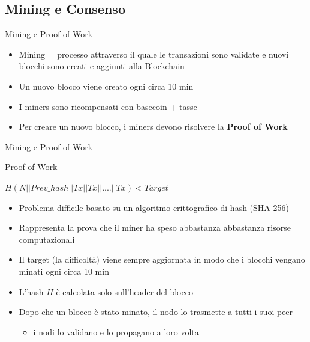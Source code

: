 \documentclass{beamer}
\begin{document}
  
  \subsection{Mining e Consenso}
  \begin{frame}{Mining e Proof of Work}
      \begin{itemize}
          \item Mining = processo attraverso il quale le transazioni sono validate e nuovi blocchi sono creati e aggiunti alla Blockchain
          \item Un nuovo blocco viene creato ogni circa 10 min 
          \item I miners sono ricompensati con basecoin + tasse
          \item Per creare un nuovo blocco, i miners devono risolvere la \textbf{Proof of Work}
      \end{itemize}
  \end{frame}
  
  
  
  \begin{frame}{Mining e Proof of Work}
      \begin{block}{Proof of Work}
      \begin{center}
          $H(N||Prev\_hash||Tx||Tx||....||Tx)<Target$
      \end{center}
        \begin{itemize}
            \item Problema difficile basato su un algoritmo crittografico di hash (SHA-256)
            \item Rappresenta la prova che il miner ha speso abbastanza abbastanza risorse computazionali
            \item Il target (la difficoltà) viene sempre aggiornata in modo che i blocchi vengano minati ogni circa 10 min
            \item L'hash $H$ è calcolata solo sull'header del blocco
            \item Dopo che un blocco è stato minato, il nodo lo trasmette a tutti i suoi peer
            \begin{itemize}
                \item[\MVRightarrow] i nodi lo validano e lo propagano a loro volta
            \end{itemize}
        \end{itemize}
      \end{block}
  \end{frame}
  
\end{document}
